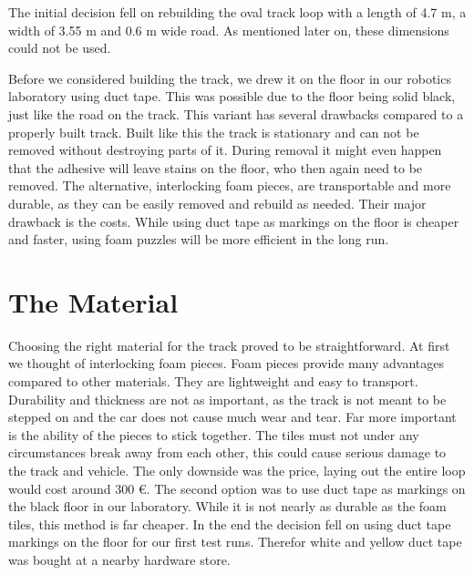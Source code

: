 The initial decision fell on rebuilding the oval track loop with a length of 4.7 m,  a width of 3.55 m and 0.6 m wide road. As mentioned later on, these dimensions could not be used.

Before we considered building the track, we drew it on the floor in our robotics laboratory using duct tape. This was possible due to the floor being solid black, just like the road on the track. This variant has several drawbacks compared to a properly built track. Built like this the track is stationary and can not be removed without destroying parts of it. During removal it might even happen that the adhesive will leave stains on the floor, who then again need to be removed. The alternative, interlocking foam pieces, are transportable and more durable, as they can be easily removed and rebuild as needed. Their major drawback is the costs. While using duct tape as markings on the floor is cheaper and faster, using foam puzzles will be more efficient in the long run.

\section{The Material}
Choosing the right material for the track proved to be straightforward. At first we thought of interlocking foam pieces. Foam pieces provide many advantages compared to other materials. They are lightweight and easy to transport. Durability and thickness are not as important, as the track is not meant to be stepped on and the car does not cause much wear and tear. Far more important is the ability of the pieces to stick together. The tiles must not under any circumstances break away from each other, this could cause serious damage to the track and vehicle. The only downside was the price, laying out the entire loop would cost around 300 €. The second option was to use duct tape as markings on the black floor in our laboratory. While it is not nearly as durable as the foam tiles, this method is far cheaper. In the end the decision fell on using duct tape markings on the floor for our first test runs. Therefor white and yellow duct tape was bought at a nearby hardware store.

